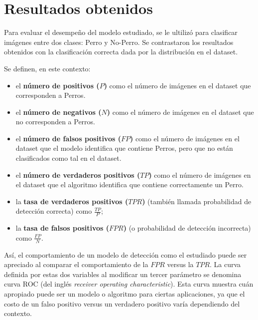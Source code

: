\documentclass[12pt]{article}
\begin{document}
\section{Resultados obtenidos}

Para evaluar el desempeño del modelo estudiado, se le ultilizó para clasificar imágenes entre dos clases:
Perro y No-Perro. Se contrastaron los resultados obtenidos con la clasificación correcta dada por la distribución en el dataset.

Se definen, en este contexto: 

\begin{itemize}
    \item el \textbf{número de positivos ($P$)} como el número de imágenes en el dataset
        que corresponden a Perros.
    \item el \textbf{número de negativos ($N$)} como el número de imágenes en el dataset
        que no corresponden a Perros.
    \item el \textbf{número de falsos positivos ($FP$)} como el número de
        imágenes en el dataset que el modelo identifica que contiene Perros, pero que no
        están clasificados como tal en el dataset.
    \item el \textbf{número de verdaderos positivos ($TP$)} como el número de
        imágenes en el dataset que el algoritmo identifica que contiene correctamente un Perro.
    \item la \textbf{tasa de verdaderos positivos ($TPR$)} (también llamada
        probabilidad de detección correcta) como $\frac{TP}{P}$;
    \item la \textbf{tasa de falsos positivos ($FPR$)} (o probabilidad de
        detección incorrecta) como $\frac{FP}{N}$.
\end{itemize}

Así, el comportamiento de un modelo de detección como el estudiado puede ser
apreciado al comparar el comportamiento de la $FPR$ versus la $TPR$. La curva
definida por estas dos variables al modificar un tercer parámetro se denomina curva
ROC (del inglés \emph{receiver operating characteristic}). Esta curva muestra
cuán apropiado puede ser un modelo o algoritmo para ciertas aplicaciones, ya que
el costo de un falso positivo versus un verdadero positivo varía dependiendo del
contexto.
\end{document}
